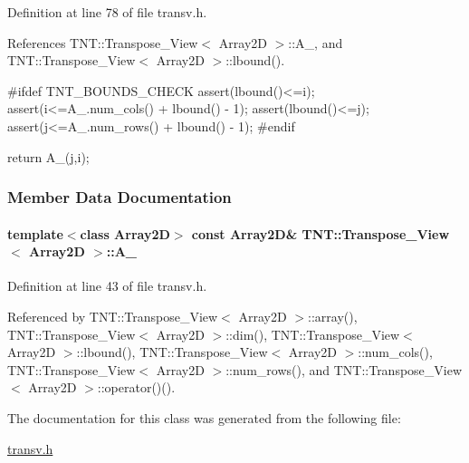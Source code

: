 Definition at line 78 of file transv.h.



References TNT::Transpose\_\-View$<$ Array2D $>$::A\_\-, and TNT::Transpose\_\-View$<$ Array2D $>$::lbound().




\begin{DoxyCode}
        {
#ifdef TNT_BOUNDS_CHECK
        assert(lbound()<=i);
        assert(i<=A_.num_cols() + lbound() - 1);
        assert(lbound()<=j);
        assert(j<=A_.num_rows() + lbound() - 1);
#endif

            return A_(j,i);
        }
\end{DoxyCode}




\subsubsection{Member Data Documentation}
\paragraph[{A\_\-}]{\setlength{\rightskip}{0pt plus 5cm}template$<$class Array2D$>$ const Array2D\& {\bf TNT::Transpose\_\-View}$<$ Array2D $>$::{\bf A\_\-}}\hfill\label{class_t_n_t_1_1_transpose___view_a5d8697c7b34914edd256dc8af2c1723d}


Definition at line 43 of file transv.h.



Referenced by TNT::Transpose\_\-View$<$ Array2D $>$::array(), TNT::Transpose\_\-View$<$ Array2D $>$::dim(), TNT::Transpose\_\-View$<$ Array2D $>$::lbound(), TNT::Transpose\_\-View$<$ Array2D $>$::num\_\-cols(), TNT::Transpose\_\-View$<$ Array2D $>$::num\_\-rows(), and TNT::Transpose\_\-View$<$ Array2D $>$::operator()().



The documentation for this class was generated from the following file:\begin{DoxyCompactItemize}
\item 
\hyperlink{transv_8h}{transv.h}\end{DoxyCompactItemize}
